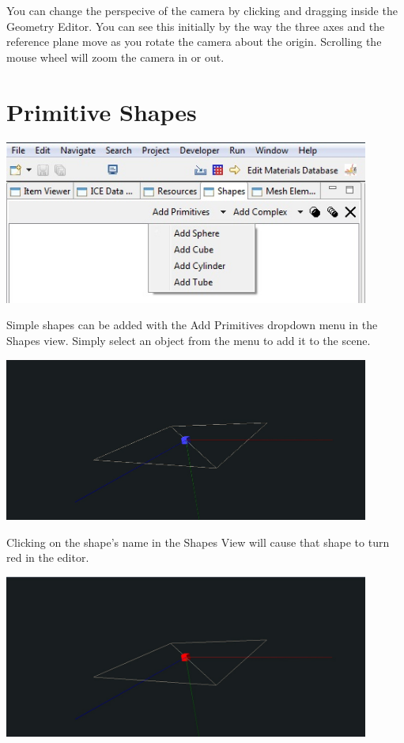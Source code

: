\documentclass{article}
\begin{document}
You can change the perspecive of the camera by clicking and dragging inside the
Geometry Editor. You can see this initially by the way the three axes and the
reference plane move as you rotate the camera about the origin. Scrolling the
mouse wheel will zoom the camera in or out.

\section{Primitive Shapes}

\begin{center}
\includegraphics[width=12cm]{images/GeometryAddPrimitive.jpg}
\end{center}

Simple shapes can be added with the Add Primitives dropdown menu in the Shapes
view. Simply select an object from the menu to add it to the scene.

\begin{center}
\includegraphics[width=12cm]{images/GeometryAddCube.jpg}
\end{center}

Clicking on the shape's name in the Shapes View will cause that shape to turn
red in the editor.

\begin{center}
\includegraphics[width=12cm]{images/GeometrySelectCube.jpg}
\end{center}
\end{document}
